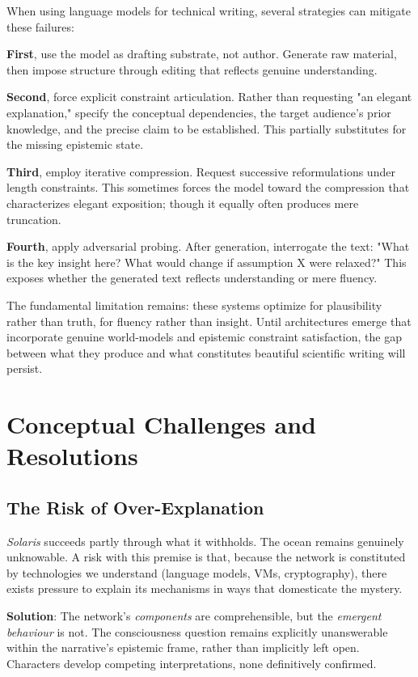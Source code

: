 When using language models for technical writing, several strategies can mitigate these failures:

\textbf{First}, use the model as drafting substrate, not author. Generate raw material, then impose structure through editing that reflects genuine understanding.

\textbf{Second}, force explicit constraint articulation. Rather than requesting "an elegant explanation," specify the conceptual dependencies, the target audience's prior knowledge, and the precise claim to be established. This partially substitutes for the missing epistemic state.

\textbf{Third}, employ iterative compression. Request successive reformulations under length constraints. This sometimes forces the model toward the compression that characterizes elegant exposition; though it equally often produces mere truncation.

\textbf{Fourth}, apply adversarial probing. After generation, interrogate the text: "What is the key insight here? What would change if assumption X were relaxed?" This exposes whether the generated text reflects understanding or mere fluency.

The fundamental limitation remains: these systems optimize for plausibility rather than truth, for fluency rather than insight. Until architectures emerge that incorporate genuine world-models and epistemic constraint satisfaction, the gap between what they produce and what constitutes beautiful scientific writing will persist.

\section*{Conceptual Challenges and Resolutions}

\subsection*{The Risk of Over-Explanation}

\textit{Solaris} succeeds partly through what it withholds. The ocean remains genuinely unknowable. A risk with this premise is that, because the network is constituted by technologies we understand (language models, VMs, cryptography), there exists pressure to explain its mechanisms in ways that domesticate the mystery.

\textbf{Solution}: The network's \textit{components} are comprehensible, but the \textit{emergent behaviour} is not. The consciousness question remains explicitly unanswerable within the narrative's epistemic frame, rather than implicitly left open. Characters develop competing interpretations, none definitively confirmed.


